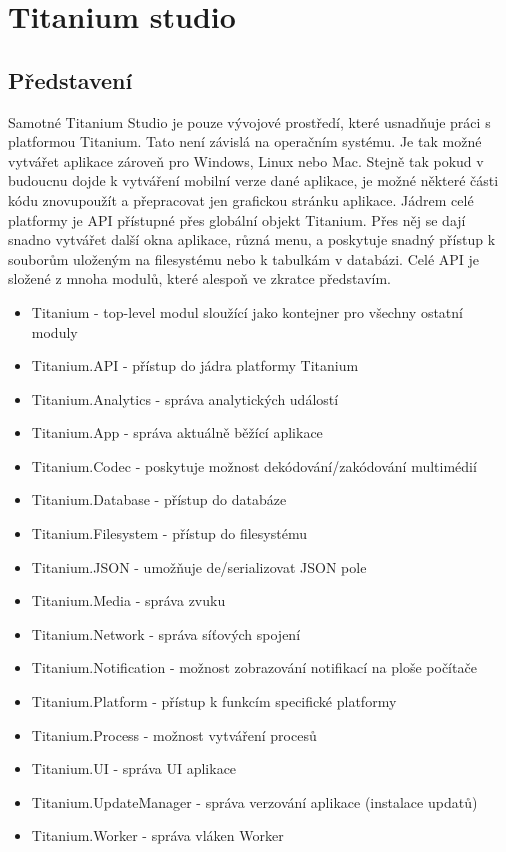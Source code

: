 \section{Titanium studio}

\subsection{Představení}

Samotné Titanium Studio je pouze vývojové prostředí, které usnadňuje práci s platformou Titanium. Tato není závislá na operačním systému. Je tak možné vytvářet aplikace zároveň pro Windows, Linux nebo Mac. Stejně tak pokud v budoucnu dojde k vytváření mobilní verze dané aplikace, je možné některé části kódu znovupoužít a přepracovat jen grafickou stránku aplikace. Jádrem celé platformy je API\cite{titanium:api} přístupné přes globální objekt Titanium. Přes něj se dají snadno vytvářet další okna aplikace, různá menu, a poskytuje snadný přístup k souborům uloženým na filesystému nebo k tabulkám v databázi. Celé API je složené z mnoha modulů, které alespoň ve zkratce představím.

\begin{itemize}
\item Titanium - top-level modul sloužící jako kontejner pro všechny ostatní moduly
\item Titanium.API - přístup do jádra platformy Titanium
\item Titanium.Analytics - správa analytických událostí
\item Titanium.App - správa aktuálně běžící aplikace
\item Titanium.Codec - poskytuje možnost dekódování/zakódování multimédií
\item Titanium.Database - přístup do databáze
\item Titanium.Filesystem - přístup do filesystému
\item Titanium.JSON - umožňuje de/serializovat JSON pole
\item Titanium.Media - správa zvuku
\item Titanium.Network - správa síťových spojení
\item Titanium.Notification - možnost zobrazování notifikací na ploše počítače
\item Titanium.Platform - přístup k funkcím specifické platformy
\item Titanium.Process - možnost vytváření procesů
\item Titanium.UI - správa UI aplikace
\item Titanium.UpdateManager - správa verzování aplikace (instalace updatů)
\item Titanium.Worker - správa vláken Worker
\end{itemize}


